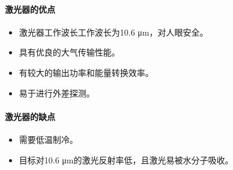 \paragraph{激光器的优点}\begin{itemize}
	\item {}激光器工作波长工作波长为10.6 μm，对人眼安全。
	\item 具有优良的大气传输性能。
	\item 有较大的输出功率和能量转换效率。
	\item 易于进行外差探测。
\end{itemize}

\paragraph{激光器的缺点}\begin{itemize}
	\item 需要低温制冷。
	\item 目标对10.6 μm的激光反射率低，且激光易被水分子吸收。
\end{itemize}

